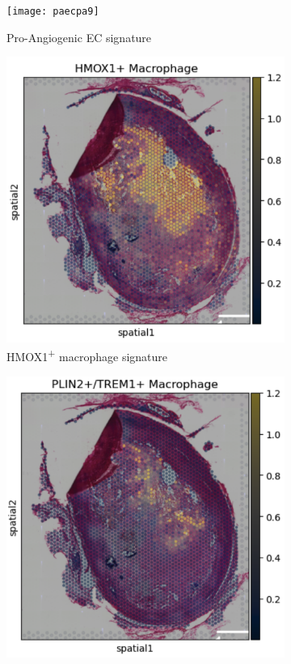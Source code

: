 \documentclass[a4paper,12pt]{article}
\begin{document}
\begin{figure}[H]
\centering
\begin{subfigure}{0.3\textwidth}
\texttt{[image: paecpa9]}
\caption{Pro-Angiogenic EC signature}
\label{fig:control_spatial}
\end{subfigure}
\hfill
\begin{subfigure}{0.3\textwidth}
\includegraphics[width=\textwidth]{hmoxpa8}
\caption{HMOX1\textsuperscript{+} macrophage signature}
\label{fig:atherosclerosis_spatial}
\end{subfigure}
\hfill
\begin{subfigure}{0.3\textwidth}
\includegraphics[width=\textwidth]{plnpa7}

\end{subfigure}
\end{figure}
\end{document}
